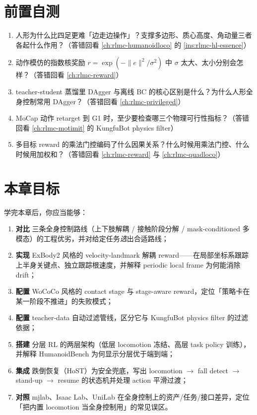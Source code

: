 \section*{前置自测}

\begin{practice}
\begin{enumerate}
  \item 人形为什么比四足更难「边走边操作」？支撑多边形、质心高度、角动量三者各起什么作用？（答错回看 \cref{ch:rlmc-humanoidloco} 的 \cref{ins:rlmc-hl-essence}）
  \item 动作模仿的指数核奖励 $r=\exp(-\lVert e\rVert^2/\sigma^2)$ 中 $\sigma$ 太大、太小分别会怎样？（答错回看 \cref{ch:rlmc-reward}）
  \item teacher-student 蒸馏里 DAgger 与离线 BC 的核心区别是什么？为什么人形全身控制常用 DAgger？（答错回看 \cref{ch:rlmc-privileged}）
  \item MoCap 动作 retarget 到 G1 时，至少要检查哪三个物理可行性指标？（答错回看 \cref{ch:rlmc-motimit} 的 KungfuBot physics filter）
  \item 多目标 reward 的乘法门控编码了什么因果关系？什么时候用乘法门控、什么时候用加权和？（答错回看 \cref{ch:rlmc-reward} 与 \cref{ch:rlmc-quadloco}）
\end{enumerate}
\end{practice}

\section*{本章目标}

学完本章后，你应当能够：
\begin{enumerate}
  \item \textbf{对比} 三条全身控制路线（上下肢解耦 / 接触阶段分解 / mask-conditioned 多模态）的工程优劣，并对给定任务\emph{选}出合适路线；
  \item \textbf{实现} ExBody2 风格的 velocity-landmark 解耦 reward——在局部坐标系跟踪上半身关键点、独立跟踪根速度，并解释 periodic local frame 为何能消除 drift；
  \item \textbf{配置} WoCoCo 风格的 contact stage 与 stage-aware reward，定位「策略卡在某一阶段不推进」的失败模式；
  \item \textbf{配置} teacher-data 自动过滤管线，区分它与 KungfuBot physics filter 的过滤依据；
  \item \textbf{搭建} 分层 RL 的两层架构（低层 locomotion 冻结、高层 task policy 训练），并解释 HumanoidBench 为何显示分层优于端到端；
  \item \textbf{集成} 跌倒恢复（HoST）为安全兜底，写出 locomotion $\to$ fall detect $\to$ stand-up $\to$ resume 的状态机并处理 action 平滑过渡；
  \item \textbf{对照} mjlab、Isaac Lab、UniLab 在全身控制上的资产/任务/接口差异，定位「把内置 locomotion 当全身控制用」的常见误区。
\end{enumerate}

